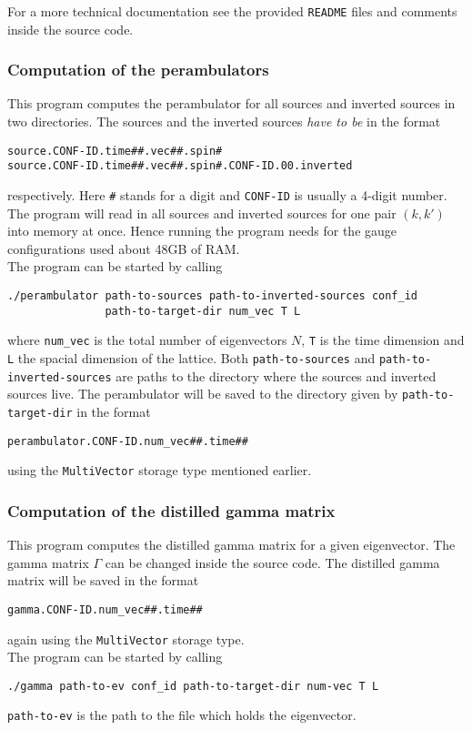     For a more technical documentation see the provided \verb+README+ files and comments inside the source code.
    
    \subsubsection{Computation of the perambulators}
        This program computes the perambulator for all sources and inverted sources in two directories.
        The sources and the inverted sources \emph{have to be} in the format
        \begin{verbatim}
source.CONF-ID.time##.vec##.spin#
source.CONF-ID.time##.vec##.spin#.CONF-ID.00.inverted\end{verbatim}
        respectively. Here \verb+#+ stands for a digit and \verb+CONF-ID+ is usually a 4-digit number. The program will read in all sources and inverted sources for one pair $(k,k')$ into memory at once. Hence running the program needs for the gauge configurations used about 48GB of RAM.\\The program can be started by calling
        \begin{verbatim}
./perambulator path-to-sources path-to-inverted-sources conf_id
               path-to-target-dir num_vec T L\end{verbatim}
        where \verb+num_vec+ is the total number of eigenvectors $N$, \verb+T+ is the time dimension and \verb+L+ the spacial dimension of the lattice. Both \verb+path-to-sources+ and \verb+path-to-inverted-sources+ are paths to the directory where the sources and inverted sources live. The perambulator will be saved to the directory given by \verb+path-to-target-dir+ in the format
        \begin{verbatim}
perambulator.CONF-ID.num_vec##.time##\end{verbatim}
        using the \verb+MultiVector+ storage type mentioned earlier.
    
    \subsubsection{Computation of the distilled gamma matrix}
        This program computes the distilled gamma matrix for a given eigenvector. The gamma matrix $\Gamma$ can be changed inside the source code. The distilled gamma matrix will be saved in the format
        \begin{verbatim}
gamma.CONF-ID.num_vec##.time##\end{verbatim}
        again using the \verb+MultiVector+ storage type.\\
        The program can be started by calling
        \begin{verbatim}
./gamma path-to-ev conf_id path-to-target-dir num-vec T L\end{verbatim}
        \verb+path-to-ev+ is the path to the file which holds the eigenvector.
        
